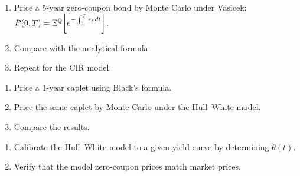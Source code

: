 \begin{exercise}
\begin{enumerate}
    \item Price a 5-year zero-coupon bond by Monte Carlo under Vasicek:
          $P(0,T) = \mathbb{E}^\mathbb{Q}\!\left[e^{-\int_0^T r_t\,dt}\right]$.
    \item Compare with the analytical formula.
    \item Repeat for the CIR model.
\end{enumerate}
\end{exercise}

\begin{exercise}
\begin{enumerate}
    \item Price a 1-year caplet using Black's formula.
    \item Price the same caplet by Monte Carlo under the Hull--White model.
    \item Compare the results.
\end{enumerate}
\end{exercise}

\begin{exercise}
\begin{enumerate}
    \item Calibrate the Hull--White model to a given yield curve by
          determining $\theta(t)$.
    \item Verify that the model zero-coupon prices match market prices.
\end{enumerate}
\end{exercise}

